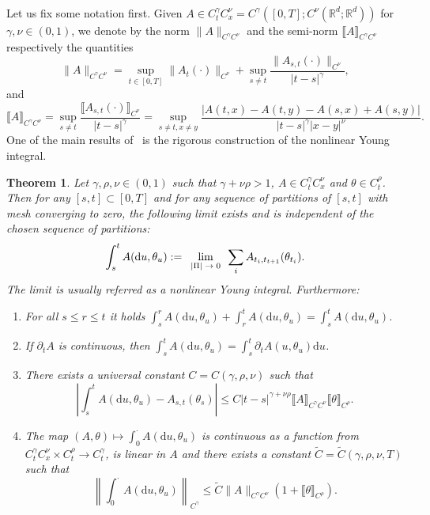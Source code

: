 \documentclass[10pt]{article}
\newcommand{\assign}{:=}
\newcommand{\mathd}{\mathrm{d}}
\newcommand{\tmcolor}[2]{{\color{#1}{#2}}}
\newcommand{\tmscript}[1]{\text{\scriptsize{$#1$}}}
\newenvironment{enumeratenumeric}{\begin{enumerate}[1.] }{\end{enumerate}}
\newtheorem{theorem}{Theorem}
\begin{document}
\

Let us fix some notation first. Given $A \in C^{\gamma}_t C^{\nu}_x =
C^{\gamma} ([0, T] ; C^{\nu} (\mathbb{R}^d ; \mathbb{R}^d))$ for $\gamma, \nu
\in (0, 1)$, we denote by the norm $\| A \|_{C^{\gamma} C^{\nu}}$ and the
semi-norm $\llbracket A \rrbracket_{C^{\gamma} C^{\nu}}$ respectively the
quantities
\[ \| A \|_{C^{\gamma} C^{\nu}} = \sup_{t \in [0, T]} \| A_t (\cdot)
   \|_{C^{\nu}} + \sup_{s \neq t} \frac{\| A_{s, t} (\cdot) \|_{C^{\nu}}}{| t
   - s |^{\gamma}}, \]
and
\[ \llbracket A \rrbracket_{C^{\gamma} C^{\nu}} = \sup_{s \neq t}
   \frac{\llbracket A_{s, t} (\cdot) \rrbracket_{C^{\nu}}}{| t - s |^{\gamma}}
   = \sup_{s \neq t, x \neq y} \frac{| A (t, x) - A (t, y) - A (s, x) + A (s,
   y) |}{| t - s |^{\gamma}  | x - y |^{\nu}} . \]
One of the main results of~{\cite{catelliergubinelli}} is the rigorous
construction of the nonlinear Young integral.

\begin{theorem}
  \label{sec4.1 thm definition young integral}Let $\gamma, \rho, \nu \in (0,
  1)$ such that $\gamma + \nu \rho > 1$, $A \in C^{\gamma}_t C^{\nu}_x$ and
  $\theta \in C^{\rho}_t$. Then for any $[s, t] \subset [0, T]$ and for any
  sequence of partitions of $[s, t]$ with mesh converging to zero, the
  following limit exists and is independent of the chosen sequence of
  partitions:
  \[ \int_s^t A (\mathd u, \theta_u) \assign
     \tmcolor{blue}{\tmcolor{black}{\lim_{\tmscript{\begin{array}{c}
       | \Pi | \rightarrow 0
     \end{array}}}}} \sum_i A_{t_i, t_{t + 1}} (\theta_{t_i}) . \]
  The limit is usually referred as a nonlinear Young integral. Furthermore:
  \begin{enumeratenumeric}
    \item For all $s \leqslant r \leqslant t$ it holds $\int_s^r A (\mathd u,
    \theta_u) + \int_r^t A (\mathd u, \theta_u) = \int_s^t A (\mathd u,
    \theta_u)$.
    
    \item If $\partial_t A$ is continuous, then $\int_s^t A (\mathd u,
    \theta_u) = \int_s^t \partial_t A (u, \theta_u) \mathd u$.
    
    \item There exists a universal constant $C = C (\gamma, \rho, \nu)$ such
    that
    \[ \left| \int_s^t A (\mathd u, \theta_u) - A_{s, t} (\theta_s) \right|
       \leqslant C | t - s |^{\gamma + \nu \rho} \llbracket A
       \rrbracket_{C^{\gamma} C^{\nu}} \llbracket \theta \rrbracket_{C^{\rho}}
       . \]
    \item The map $(A, \theta) \mapsto \int_0^{\cdot} A (\mathd u, \theta_u)$
    is continuous as a function from $C^{\gamma}_t C^{\nu}_x \times C^{\rho}_t
    \rightarrow C^{\gamma}_t$, is linear in $A$ and there exists a constant
    $\tilde{C} = \tilde{C} (\gamma, \rho, \nu, T)$ such that
    \[ \left\| \int_0^{\cdot} A (\mathd u, \theta_u) \right\|_{C^{\gamma}}
       \leqslant \tilde{C}  \| A \|_{C^{\gamma} C^{\nu}}  (1 + \llbracket
       \theta \rrbracket_{C^{\rho}}) . \]
  \end{enumeratenumeric}
\end{theorem}
\end{document}
